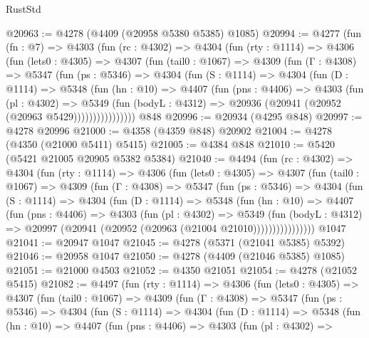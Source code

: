 \begin{lexlean}{RustStd}
\begin{coremodule}
{\begin{coremodule}
{{{{{{{{{{{{{{{{{{{{{{{{{{{{{{{{{{{@20963 := @4278 (@4409 (@20958 @5380 @5385) @1085)
@20994 := @4277
    (fun (fn : @7) =>
    @4303
      (fun (rc : @4302) =>
      @4304
        (fun (rty : @1114) =>
        @4306
          (fun (lets0 : @4305) =>
          @4307
            (fun (tail0 : @1067) =>
            @4309
              (fun (Γ : @4308) =>
              @5347
                (fun (ps : @5346) =>
                @4304
                  (fun (S : @1114) =>
                  @4304
                    (fun (D : @1114) =>
                    @5348
                      (fun (hn : @10) =>
                      @4407
                        (fun (pns : @4406) =>
                        @4303
                          (fun (pl : @4302) =>
                          @5349
                            (fun (bodyL : @4312) =>
                            @20936 (@20941 (@20952 (@20963 @5429))))))))))))))))
    @848
@20996 := @20934 (@4295 @848)
@20997 := @4278 @20996
@21000 := @4358 (@4359 @848) @20902
@21004 := @4278 (@4350 (@21000 @5411) @5415)
@21005 := @4384 @848
@21010 := @5420 (@5421 @21005 @20905 @5382 @5384)
@21040 := @4494
    (fun (rc : @4302) =>
    @4304
      (fun (rty : @1114) =>
      @4306
        (fun (lets0 : @4305) =>
        @4307
          (fun (tail0 : @1067) =>
          @4309
            (fun (Γ : @4308) =>
            @5347
              (fun (ps : @5346) =>
              @4304
                (fun (S : @1114) =>
                @4304
                  (fun (D : @1114) =>
                  @5348
                    (fun (hn : @10) =>
                    @4407
                      (fun (pns : @4406) =>
                      @4303
                        (fun (pl : @4302) =>
                        @5349
                          (fun (bodyL : @4312) =>
                          @20997 (@20941 (@20952 (@20963 (@21004 @21010))))))))))))))))
    @1047
@21041 := @20947 @1047
@21045 := @4278 (@5371 (@21041 @5385) @5392)
@21046 := @20958 @1047
@21050 := @4278 (@4409 (@21046 @5385) @1085)
@21051 := @21000 @4503
@21052 := @4350 @21051
@21054 := @4278 (@21052 @5415)
@21082 := @4497
    (fun (rty : @1114) =>
    @4306
      (fun (lets0 : @4305) =>
      @4307
        (fun (tail0 : @1067) =>
        @4309
          (fun (Γ : @4308) =>
          @5347
            (fun (ps : @5346) =>
            @4304
              (fun (S : @1114) =>
              @4304
                (fun (D : @1114) =>
                @5348
                  (fun (hn : @10) =>
                  @4407
                    (fun (pns : @4406) =>
                    @4303
                      (fun (pl : @4302) =>
}}}}}}}}}}}}}}}}}}}}}}}}}}}}}}}}}}}
\end{coremodule}}
\end{coremodule}
\end{lexlean}
